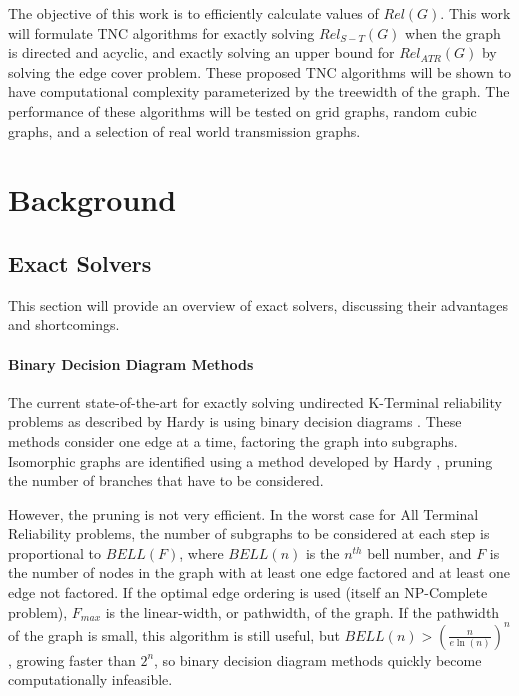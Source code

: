 \documentclass[12pt,twocolumn]{article}
\begin{document}
The objective of this work is to efficiently calculate values of \(Rel(G)\). This work will formulate TNC algorithms for exactly solving \(Rel_{S-T}(G)\) when the graph is directed and acyclic, and exactly solving an upper bound for \(Rel_{ATR}(G)\) by solving the edge cover problem. These proposed TNC algorithms will be shown to have computational complexity parameterized by the treewidth of the graph. The performance of these algorithms will be tested on grid graphs, random cubic graphs, and a selection of real world transmission graphs.

\hypertarget{background}{%
\section{Background}\label{background}}

\hypertarget{exact-solvers}{%
\subsection{Exact Solvers}\label{exact-solvers}}

This section will provide an overview of exact solvers, discussing their advantages and shortcomings.

\hypertarget{binary-decision-diagram-methods}{%
\paragraph{\texorpdfstring{Binary Decision Diagram Methods\\
}{Binary Decision Diagram Methods }}\label{binary-decision-diagram-methods}}

The current state-of-the-art for exactly solving undirected K-Terminal reliability problems as described by Hardy is using binary decision diagrams \cite{hardy2007k}. These methods consider one edge at a time, factoring the graph into subgraphs. Isomorphic graphs are identified using a method developed by Hardy \cite{carlier1996decomposition}, pruning the number of branches that have to be considered.

However, the pruning is not very efficient. In the worst case for All Terminal Reliability problems, the number of subgraphs to be considered at each step is proportional to \(BELL(F)\), where \(BELL(n)\) is the \(n^{th}\) bell number, and \(F\) is the number of nodes in the graph with at least one edge factored and at least one edge not factored. If the optimal edge ordering is used (itself an NP-Complete problem), \(F_{max}\) is the linear-width, or pathwidth, of the graph. If the pathwidth of the graph is small, this algorithm is still useful, but \(BELL(n)>(\frac{n}{e\ln(n)})^n\) \cite{berend2010improved}, growing faster than \(2^n\), so binary decision diagram methods quickly become computationally infeasible.
\end{document}
